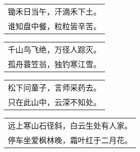 \noindent\begin{minipage}{\linewidth}
  \vskip-3pt\begin{table}[H]
    \centering
    \begin{tabular}{@{}l@{}}
锄禾日当午，汗滴禾下土。\\
谁知盘中餐，粒粒皆辛苦。
    \end{tabular}
  \end{table}
\end{minipage}
\vspace{1cm}


\noindent\begin{minipage}{\linewidth}
  \vskip-3pt\begin{table}[H]
    \centering
    \begin{tabular}{@{}l@{}}
千山鸟飞绝，万径人踪灭。\\
孤舟蓑笠翁，独钓寒江雪。
    \end{tabular}
  \end{table}
\end{minipage}
\vspace{1cm}


\noindent\begin{minipage}{\linewidth}
  \vskip-3pt\begin{table}[H]
    \centering
    \begin{tabular}{@{}l@{}}
松下问童子，言师采药去。\\
只在此山中，云深不知处。
    \end{tabular}
  \end{table}
\end{minipage}
\vspace{1cm}


\noindent\begin{minipage}{\linewidth}
  \vskip-3pt\begin{table}[H]
    \centering
    \begin{tabular}{@{}l@{}}
远上寒山石径斜，白云生处有人家。\\
停车坐爱枫林晚，霜叶红于二月花。
    \end{tabular}
  \end{table}
\end{minipage}
\vspace{1cm}


